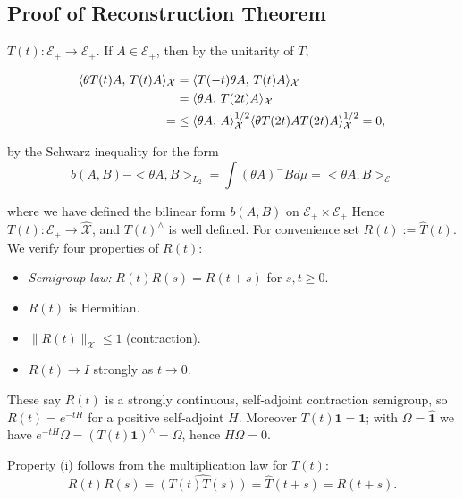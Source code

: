 \documentclass{article}
\newcommand{\1}{\mathbbm{1}}
\theoremstyle{plain}
\theoremstyle{definition}
\numberwithin{equation}{section}
\begin{document}
\subsection{Proof of Reconstruction Theorem}


 \(T(t)\colon\mathcal{E}_{+}\to\mathcal{E}_{+}\).
If \(A\in\mathcal{E}_{+}\), then by the unitarity of \(T\),

\begin{equation}\label{ 6.1.14}
    \begin{split}
      \langle\theta T(t)A,\,T(t) A\rangle_{\mathcal {X}}
   &=\langle T(-t)\theta A,\,T(t)A\rangle_{\mathcal{ X}}\notag\\
   &=\langle\theta A,\,T(2t)A\rangle_{\mathcal{ X}}\notag\\
  = &\le\langle\theta A,\,A\rangle_{\mathcal{ X}}^{1/2}
        \langle\theta T(2t)AT(2t)A\rangle_{\mathcal{X}}^{1/2}=0,  
    \end{split}
\end{equation}


by the Schwarz inequality for the form
\begin{equation}
    b (A, B) - < \theta A, B >_{L_2}= \int (\theta A)^- B d \mu = < \theta A, B>_\mathcal{E}
\end{equation}

where we have defined the bilinear form $b(A,B)$ on $\mathcal{E}_+ \times \mathcal{E}_+$
Hence \(T(t)\colon\mathcal{E}_{+}\to\widehat{\mathcal{X}}\), and
\(T(t)^{\wedge}\) is well defined.  
For convenience set \(R(t):=\hat{T}(t)\).
We verify four properties of \(R(t)\):

\begin{itemize}
    \item \emph{Semigroup law:} \(R(t)R(s)=R(t+s)\) for \(s,t\ge0\).
\item \(R(t)\) is Hermitian.
\item \(\lVert R(t)\rVert_{\mathcal X}\le1\) (contraction).
\item \(R(t)\to I\) strongly as \(t\to0\). 
\end{itemize}



These say \(R(t)\) is a strongly continuous, self‑adjoint contraction
semigroup, so \(R(t)=e^{-tH}\) for a positive self‑adjoint \(H\).
Moreover \(T(t)\mathbf1=\mathbf1\); with \(\Omega=\widehat{\mathbf1}\) we have
\(e^{-tH}\Omega=(T(t)\mathbf1)^{\wedge}=\Omega\), hence \(H\Omega=0\).

Property (i) follows from the multiplication law for \(T(t)\):
\[
R(t)R(s)=\hat{(T(t)T(s))}=\hat{T}(t+s)=R(t+s).
\]
\end{document}
